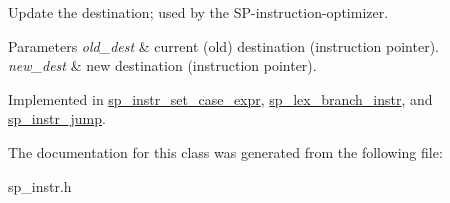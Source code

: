 Update the destination; used by the SP-\/instruction-\/optimizer.


\begin{DoxyParams}{Parameters}
{\em old\+\_\+dest} & current (old) destination (instruction pointer). \\
\hline
{\em new\+\_\+dest} & new destination (instruction pointer). \\
\hline
\end{DoxyParams}


Implemented in \mbox{\hyperlink{classsp__instr__set__case__expr_a7b2952b03aa0a30f407d88fd75ebdbae}{sp\+\_\+instr\+\_\+set\+\_\+case\+\_\+expr}}, \mbox{\hyperlink{classsp__lex__branch__instr_ae3ef8f864474467824615e33f0663d76}{sp\+\_\+lex\+\_\+branch\+\_\+instr}}, and \mbox{\hyperlink{classsp__instr__jump_aee2d8071b4f12109135a0e22a9ba3c71}{sp\+\_\+instr\+\_\+jump}}.



The documentation for this class was generated from the following file\+:\begin{DoxyCompactItemize}
\item 
sp\+\_\+instr.\+h\end{DoxyCompactItemize}
